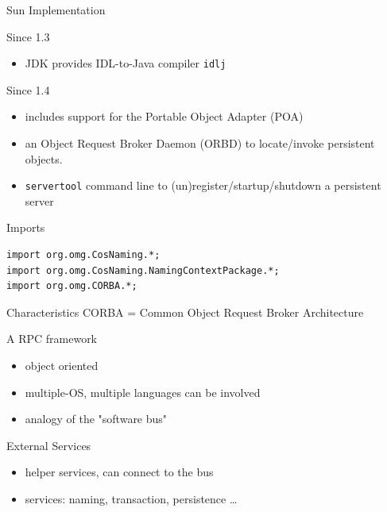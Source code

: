 \documentclass[bigger,hyperref={colorlinks=true, urlcolor=red, plainpages=false, pdfpagelabels, bookmarksnumbered}]{beamer}
\begin{document}
\begin{frame}[fragile,label=sec-4-2]{Sun Implementation}
 \begin{block}{Since 1.3}
\begin{itemize}
\item JDK provides IDL-to-Java compiler \texttt{idlj}
\end{itemize}
\end{block}
\begin{block}{Since 1.4}
\begin{itemize}
\item includes support for the Portable Object Adapter (POA)
\item an Object Request Broker Daemon (ORBD) to locate/invoke persistent objects.
\item \texttt{servertool}  command line to (un)register/startup/shutdown a persistent server
\end{itemize}
\end{block}

\begin{block}{Imports}
\lstset{language=java,label= ,caption= ,numbers=none}
\begin{lstlisting}
import org.omg.CosNaming.*;
import org.omg.CosNaming.NamingContextPackage.*;
import org.omg.CORBA.*;
\end{lstlisting}
\end{block}
\end{frame}

\begin{frame}[label=sec-4-3]{Characteristics}
CORBA = Common Object Request Broker Architecture

\begin{block}{A RPC framework}
\begin{itemize}
\item object oriented
\item multiple-OS, multiple languages can be involved
\item analogy of the "software bus"
\end{itemize}
\end{block}
\begin{block}{External Services}
\begin{itemize}
\item helper services, can connect to the bus
\item services: naming, transaction, persistence \ldots{}
\end{itemize}
\end{block}
\end{frame}
\end{document}
